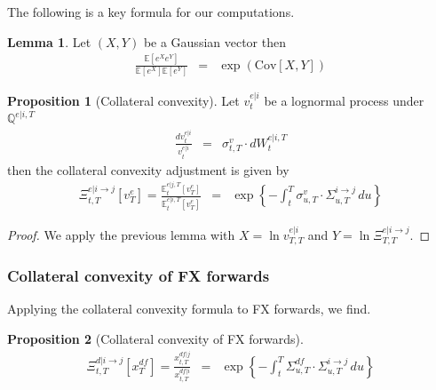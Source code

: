 \documentclass[11pt,english]{amsart}
\newcommand{\EE}{\mathbb{E}}
\newcommand{\QQ}{\mathbb{Q}}
\newcommand{\Cov}{\mathrm{Cov}}
\newcommand{\Q}{\Xi}
\theoremstyle{definition}
\newtheorem{prop}{Proposition}
\newtheorem{lemm}{Lemma}
\begin{document}
The following is a key formula for our computations.

\begin{lemm}
Let $(X,Y)$ be a Gaussian vector then 
\begin{eqnarray}
  \frac{\EE[e^X e^Y] } {\EE[e^X] \EE[e^Y] } &=& \exp\left( \Cov[X,Y] \right)  
\end{eqnarray} 
\end{lemm}
 
\begin{prop}[Collateral convexity]\label{prop:collateral_convexity}
Let $v^{e|i}_t$ be a lognormal process under $\QQ^{e|i,T}$ 
\begin{eqnarray}
  \frac{dv^{e|i}_{t}}{v^{e|i}_{t}} &=& \sigma^{v}_{t,T} \cdot dW^{e|i,T}_t 
\end{eqnarray} 
then the collateral convexity adjustment is given by 
\begin{eqnarray}
  \Q^{e|i\to j}_{t,T}[v^e_T] = \frac{\EE^{e|j,T}_t\left[ v^e_T \right] } {\EE^{e|i,T}_t\left[ v^e_T \right] } 
  &=& \exp\left\{ -\int_t^T \sigma^{v}_{u,T} \cdot \Sigma^{i\to j}_{u,T} \, du \right\}
\end{eqnarray} 
\end{prop}

\begin{proof}
We apply the previous lemma with $X = \ln v^{e|i}_{T,T}$ and $Y = \ln \Q^{e|i\to j}_{T,T}$. 
\end{proof}

\subsubsection{Collateral convexity of FX forwards}%
Applying the collateral convexity formula to FX forwards, we find.

\begin{prop}[Collateral convexity of FX forwards]
\begin{eqnarray}
        \Q^{d|i\to j}_{t,T}[x^{df}_T] =
	 \frac{x^{df|j}_{t,T}}{x^{df|i}_{t,T}} 
	&=& \exp\left\{ -\int_t^T \Sigma^{df}_{u,T}  \cdot \Sigma^{i\to j}_{u,T} \, du \right\}
\end{eqnarray} 
\end{prop}
\end{document}
